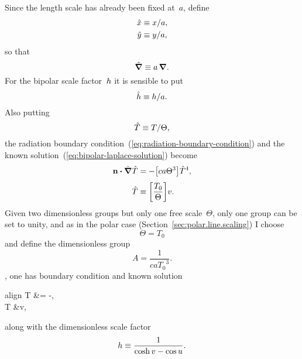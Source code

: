 Since the length scale has already been fixed at~$a$,
define
\begin{align}
  \hat{x} &\equiv x / a, \label{eq:bipolar-scaled-x} \\
  \hat{y} &\equiv y / a, \label{eq:bipolar-scaled-y}
\end{align}
so that
\begin{equation}
  \mathop{}\!\hat{\mathop{}\!\boldsymbol{\mathbf{\nabla}}} \equiv a \mathop{}\!\boldsymbol{\mathbf{\nabla}}.
  \label{eq:bipolar-scaled-del}
\end{equation}
For the bipolar scale factor~$\scalefac$ it is sensible to put
\begin{equation}
  \scaled{\scalefac} \ideq \scalefac / a.
  \label{eq:bipolar-scaled-scale-factor}
\end{equation}
Also putting
\begin{equation}
  \hat{T} \equiv T / \Theta,
  \label{eq:bipolar-scaled-temperature}
\end{equation}
the radiation boundary condition~(\ref{eq:radiation-boundary-condition})
and the known solution~(\ref{eq:bipolar-laplace-solution})
become
\begin{align}
  \normalvec \dotp \scaleddel \scaled{T}
    &= -\group{c a \Theta^3} \scaled{T}^4,
    \label{eq:bipolar-scaled-radiation-boundary-condition-with-groups}
    \\[\tallspace]
  \scaled{T} &\ideq \group{\frac{T_0}{\Theta}} v.
    \label{eq:bipolar-scaled-laplace-solution-with-groups}
\end{align}
Given two dimensionless groups but only one free scale~$\Theta$,
only one group can be set to unity,
and as in the polar case (Section~\ref{sec:polar.line.scaling})
I choose
\begin{equation}
  \Theta = T_0
    \label{eq:bipolar-temperature-scale}
\end{equation}
and define the dimensionless group
\begin{equation}
  A = \frac{1}{c a {T_0}^3}.
  \label{eq:bipolar-dimensionless-group}
\end{equation}
,
one has boundary condition and known solution
\begin{important}{align}
  \normalvec \dotp \del T &= -,
    \label{eq:bipolar-scaled-radiation-boundary-condition} \\
  T &\ideq v,
    \label{eq:bipolar-scaled-laplace-solution}
\end{important}
along with the dimensionless scale factor
\begin{equation}
  \scalefac \ideq \frac{1}{\cosh v - \cos u}.
  \label{eq:dimensionless-scale-factor-bipolar}
\end{equation}

